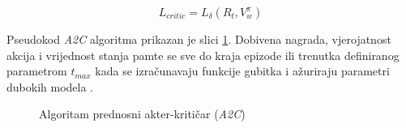 \begin{equation}
    \label{md:a2c-critic-loss}
    L_{critic} = L_\delta(R_t, V_{w}^{\pi})
\end{equation}

\bigskip

Pseudokod \textit{A2C} algoritma prikazan je slici \ref{fig:a2c-algorithm}. Dobivena nagrada, vjerojatnost akcija i vrijednost stanja pamte se sve do kraja epizode ili trenutka definiranog parametrom $t_{max}$ kada se izračunavaju funkcije gubitka i ažuriraju parametri dubokih modela \cite{A2C}.

\begin{figure}[H]
    \centering
    \caption{Algoritam prednosni akter-kritičar (\textit{A2C}) \cite{A2C}}
    \label{fig:a2c-algorithm}
\end{figure}
